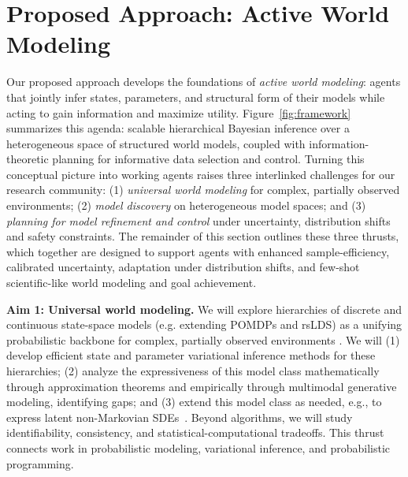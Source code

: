 \documentclass[11pt,letterpaper]{article}
\begin{document}
\section*{Proposed Approach: Active World Modeling}

Our proposed approach develops the foundations of \emph{active world modeling}: agents that jointly infer states, parameters, and structural form of their models while acting to gain information and maximize utility. Figure~\ref{fig:framework} summarizes this agenda: scalable hierarchical Bayesian inference over a heterogeneous space of structured world models, coupled with information-theoretic planning for informative data selection and control. Turning this conceptual picture into working agents raises three interlinked challenges for our research community: (1) \emph{universal world modeling} for complex, partially observed environments; (2) \emph{model discovery} on heterogeneous model spaces; and (3) \emph{planning for model refinement and control} under uncertainty, distribution shifts and safety constraints. The remainder of this section outlines these three thrusts, which together are designed to support agents with enhanced sample-efficiency, calibrated uncertainty, adaptation under distribution shifts, and few-shot scientific-like world modeling and goal achievement.

\textbf{Aim 1: Universal world modeling.}
We will explore hierarchies of discrete and continuous state-space models (e.g. extending POMDPs and rsLDS) as a unifying probabilistic backbone for complex, partially observed environments \cite{da_costa_natural_2025}. We will (1) develop efficient state and parameter variational inference methods for these hierarchies; (2) analyze the expressiveness of this model class mathematically through approximation theorems and empirically through multimodal generative modeling, identifying gaps; and (3) extend this model class as needed, e.g., to express latent non-Markovian SDEs~\cite{da_costa_toward_2024}. Beyond algorithms, we will study identifiability, consistency, and statistical-computational tradeoffs. This thrust connects work in probabilistic modeling, variational inference, and probabilistic programming.
\end{document}
